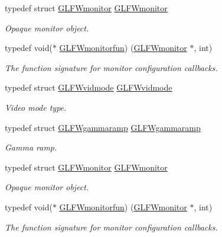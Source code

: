 \begin{DoxyCompactItemize}
typedef struct \hyperlink{group__monitor_ga8d9efd1cde9426692c73fe40437d0ae3}{G\+L\+F\+Wmonitor} \hyperlink{group__monitor_ga8d9efd1cde9426692c73fe40437d0ae3}{G\+L\+F\+Wmonitor}
\begin{DoxyCompactList}\small\item\em Opaque monitor object. \end{DoxyCompactList}\item 
typedef void($\ast$ \hyperlink{group__monitor_ga8a7ee579a66720f24d656526f3e44c63}{G\+L\+F\+Wmonitorfun}) (\hyperlink{group__monitor_ga8d9efd1cde9426692c73fe40437d0ae3}{G\+L\+F\+Wmonitor} $\ast$, int)
\begin{DoxyCompactList}\small\item\em The function signature for monitor configuration callbacks. \end{DoxyCompactList}\item 
typedef struct \hyperlink{structGLFWvidmode}{G\+L\+F\+Wvidmode} \hyperlink{group__monitor_gae48aadf4ea0967e6605c8f58fa5daccb}{G\+L\+F\+Wvidmode}
\begin{DoxyCompactList}\small\item\em Video mode type. \end{DoxyCompactList}\item 
typedef struct \hyperlink{structGLFWgammaramp}{G\+L\+F\+Wgammaramp} \hyperlink{group__monitor_gaec0bd37af673be8813592849f13e02f0}{G\+L\+F\+Wgammaramp}
\begin{DoxyCompactList}\small\item\em Gamma ramp. \end{DoxyCompactList}\item 
typedef struct \hyperlink{group__monitor_ga8d9efd1cde9426692c73fe40437d0ae3}{G\+L\+F\+Wmonitor} \hyperlink{group__monitor_ga8d9efd1cde9426692c73fe40437d0ae3}{G\+L\+F\+Wmonitor}
\begin{DoxyCompactList}\small\item\em Opaque monitor object. \end{DoxyCompactList}\item 
typedef void($\ast$ \hyperlink{group__monitor_ga8a7ee579a66720f24d656526f3e44c63}{G\+L\+F\+Wmonitorfun}) (\hyperlink{group__monitor_ga8d9efd1cde9426692c73fe40437d0ae3}{G\+L\+F\+Wmonitor} $\ast$, int)
\begin{DoxyCompactList}\small\item\em The function signature for monitor configuration callbacks. \end{DoxyCompactList}\item 

\end{DoxyCompactItemize}
